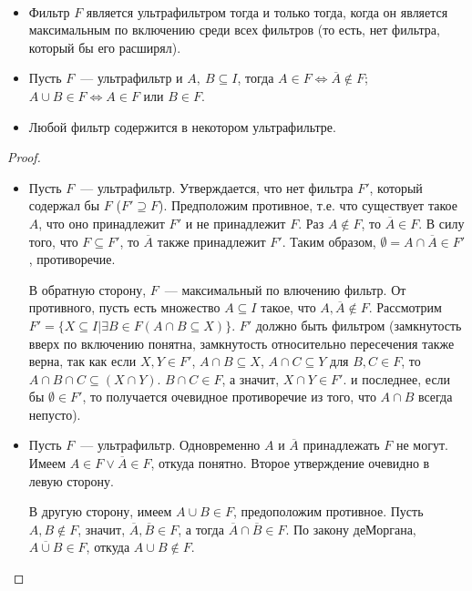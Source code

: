 \begin{stat} \ 
    \begin{itemize}
        \item Фильтр $F$ является ультрафильтром тогда и только тогда, когда он является максимальным по включению среди всех фильтров (то есть, нет фильтра, который бы его расширял). 
        \item Пусть $F$~— ультрафильтр и $A, \: B \subseteq I$, тогда $A \in F \Longleftrightarrow \overline{A} \notin F$; $A \cup B \in F \Longleftrightarrow A \in F$ или $B \in F$.
        \item Любой фильтр содержится в некотором ультрафильтре.
    \end{itemize}
\end{stat}

\begin{proof} \ 
    \begin{itemize}
        \item Пусть $F$~— ультрафильтр. Утверждается, что нет фильтра $F'$, который содержал бы $F$ ($F' \supseteq F$). Предположим противное, т.е. что существует такое $A$, что оно принадлежит $F'$ и не принадлежит $F$. Раз $A \notin F$, то $\overline{A} \in F$. В силу того, что $F \subseteq F'$, то $\overline{A}$ также принадлежит $F'$. Таким образом, $\emptyset = A \cap \overline{A} \in F'$, противоречие. 
        
        В обратную сторону, $F$~— максимальный по влючению фильтр. От противного, пусть есть множество $A \subseteq I$ такое, что $A, \overline{A} \notin F$. Рассмотрим $F' = \{X \subseteq I | \exists B \in F (A \cap B \subseteq X)\}$. $F'$ должно быть фильтром (замкнутость вверх по включению понятна, замкнутость относительно пересечения также верна, так как если $X, Y \in F'$, $A \cap B \subseteq X$, $A \cap C \subseteq Y$ для $B, C \in F$, то $A \cap B \cap C \subseteq (X \cap Y)$. $B \cap C \in F$, а значит, $X \cap Y \in F'$. и последнее, если бы $\emptyset \in F'$, то получается очевидное противоречие из того, что $A \cap B$ всегда непусто). 
        
        \item Пусть $F$~— ультрафильтр. Одновременно $A$ и $\overline{A}$ принадлежать $F$ не могут. Имеем $A \in F \vee \overline{A} \in F$, откуда понятно. Второе утверждение очевидно в левую сторону.
        
        В другую сторону, имеем $A \cup B \in F$, предоположим противное. Пусть $A, B \notin F$, значит, $\overline{A}, \overline{B} \in F$, а тогда $\overline{A} \cap \overline{B} \in F$. По закону деМоргана, $\overline{A \cup B} \in F$, откуда $A \cup B \notin F$. 


\end{itemize}
\end{proof}
